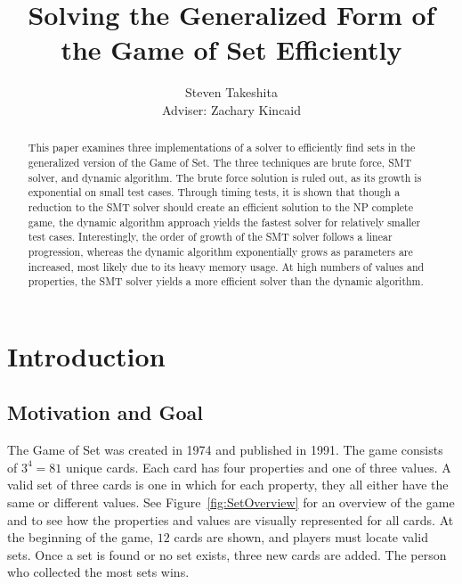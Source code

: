 \documentclass[pageno]{jpaper}
\begin{document}
\title{Solving the Generalized Form of the Game of Set Efficiently}

\author{Steven Takeshita\\Adviser: Zachary Kincaid}

\date{}
\maketitle

\thispagestyle{empty}
\doublespacing
\begin{abstract}
This paper examines three implementations of a solver to efficiently find sets in the generalized version of the Game of Set. The three techniques are brute force, SMT solver, and dynamic algorithm. The brute force solution is ruled out, as its growth is exponential on small test cases. Through timing tests, it is shown that though a reduction to the SMT solver should create an efficient solution to the NP complete game, the dynamic algorithm approach yields the fastest solver for relatively smaller test cases. Interestingly, the order of growth of the SMT solver follows a linear progression, whereas the dynamic algorithm exponentially grows as parameters are increased, most likely due to its heavy memory usage. At high numbers of values and properties, the SMT solver yields a more efficient solver than the dynamic algorithm. 
\end{abstract}

\section{Introduction}

\subsection{Motivation and Goal}

The Game of Set was created in 1974 and published in 1991. The game consists of $3^4 = 81$ unique cards. Each card has four properties and one of three values. A valid set of three cards is one in which for each property, they all either have the same or different values. See Figure~\ref{fig:SetOverview} for an overview of the game and to see how the properties and values are visually represented for all cards. At the beginning of the game, $12$ cards are shown, and players must locate valid sets. Once a set is found or no set exists, three new cards are added. The person who collected the most sets wins. 
\end{document}
